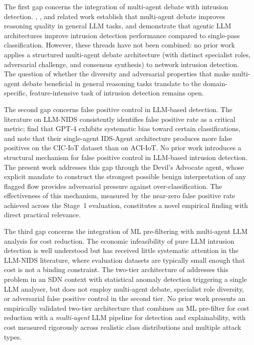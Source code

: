 \documentclass[../main.tex]{subfiles}
\begin{document}
The first gap concerns the integration of multi-agent debate with intrusion detection. \textcite{Du2023}, \textcite{Chan2023}, and related work establish that multi-agent debate improves reasoning quality in general LLM tasks, and \textcite{Li2024} demonstrate that agentic LLM architectures improve intrusion detection performance compared to single-pass classification. However, these threads have not been combined: no prior work applies a structured multi-agent debate architecture (with distinct specialist roles, adversarial challenge, and consensus synthesis) to network intrusion detection. The question of whether the diversity and adversarial properties that make multi-agent debate beneficial in general reasoning tasks translate to the domain-specific, feature-intensive task of intrusion detection remains open.

The second gap concerns false positive control in LLM-based detection. The literature on LLM-NIDS consistently identifies false positive rate as a critical metric; \textcite{Houssel2024} find that GPT-4 exhibits systematic bias toward certain classifications, and \textcite{Li2024} note that their single-agent IDS-Agent architecture produces more false positives on the CIC-IoT dataset than on ACI-IoT. No prior work introduces a structural mechanism for false positive control in LLM-based intrusion detection. The present work addresses this gap through the Devil's Advocate agent, whose explicit mandate to construct the strongest possible benign interpretation of any flagged flow provides adversarial pressure against over-classification. The effectiveness of this mechanism, measured by the near-zero false positive rate achieved across the Stage~1 evaluation, constitutes a novel empirical finding with direct practical relevance.

The third gap concerns the integration of ML pre-filtering with multi-agent LLM analysis for cost reduction. The economic infeasibility of pure LLM intrusion detection is well understood but has received little systematic attention in the LLM-NIDS literature, where evaluation datasets are typically small enough that cost is not a binding constraint. The two-tier architecture of \textcite{Kalafatidis2025} addresses this problem in an SDN context with statistical anomaly detection triggering a single LLM analyser, but does not employ multi-agent debate, specialist role diversity, or adversarial false positive control in the second tier. No prior work presents an empirically validated two-tier architecture that combines an ML pre-filter for cost reduction with a \textit{multi-agent} LLM pipeline for detection and explainability, with cost measured rigorously across realistic class distributions and multiple attack types.
\end{document}
